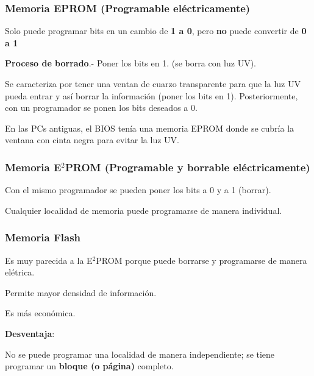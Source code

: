 \documentclass{article}
\begin{document}
\subsubsection{Memoria EPROM (Programable eléctricamente)}

Solo puede programar bits en un cambio de \textbf{1 a 0}, pero \textbf{no} puede convertir de
\textbf{0 a 1}

\vspace{1em}
\textbf{Proceso de borrado}.- Poner los bits en 1. (se borra con luz UV).

\vspace{1em}
Se caracteriza por tener una ventan de cuarzo transparente para que la luz UV
pueda entrar y así borrar la información (poner los bits en 1).  Posteriormente,
con un programador se ponen los bits deseados a 0.

\vspace{1em}
En las PCs antiguas, el BIOS tenía una memoria EPROM donde se cubría la ventana
con cinta negra para evitar la luz UV.

\subsubsection{Memoria E$^2$PROM (Programable y borrable eléctricamente)}

\vspace{1em}
Con el mismo programador se pueden poner los bits a 0 y a 1 (borrar).

\vspace{1em}
Cualquier localidad de memoria puede programarse de manera individual.

\subsubsection{Memoria Flash}

Es muy parecida a la E$^2$PROM porque puede borrarse y programarse de manera
elétrica.

\vspace{1em}
Permite mayor densidad de información.

\vspace{1em}
Es más económica.

\vspace{1em}
\textbf{Desventaja}:

\vspace{1em}
No se puede programar una localidad de manera independiente; se tiene programar
un \textbf{bloque (o página)} completo.
\end{document}
